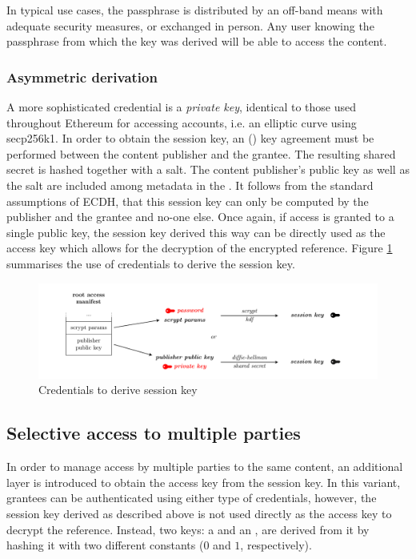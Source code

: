 In typical use cases, the passphrase is distributed by an off-band means with adequate security measures, or exchanged in person. Any user knowing the passphrase from which the key was derived will be able to access the content.

\subsubsection{Asymmetric derivation}

A more sophisticated credential is a \emph{private key}, identical to those used throughout Ethereum for accessing accounts, i.e. an  elliptic curve using secp256k1. In order to obtain the session key, an  () key agreement must be performed between the content publisher and the grantee. The resulting shared secret is hashed together with a salt. The content publisher's public key as well as the salt are included among metadata in the . It follows from the standard assumptions of ECDH, that this session key can only be computed by the publisher and the grantee and no-one else. 
Once again, if access is granted to a single public key, the session key derived this way can be directly used as the access key which allows for the decryption of the encrypted reference. 
Figure \ref{fig:credentials-to-derive-session-key} summarises the use of credentials to derive the session key.

\begin{figure}[htbp]
\centering
\includegraphics[width=\textwidth]{fig/credentials-to-derive-session-key.pdf}
\caption[Credentials to derive session key  \statusyellow]{Credentials to derive session key}
\label{fig:credentials-to-derive-session-key}
\end{figure}


\subsection{Selective access to multiple parties\statusgreen}

In order to manage access by multiple parties to the same content, an additional layer is introduced to obtain the access key from the session key. In this variant, grantees can be authenticated using either type of credentials, however, the session key derived as
described above is not used directly as the access key to decrypt the reference. Instead, two keys: a  and an , are derived from it by hashing it with two different constants ($0$ and $1$, respectively).

